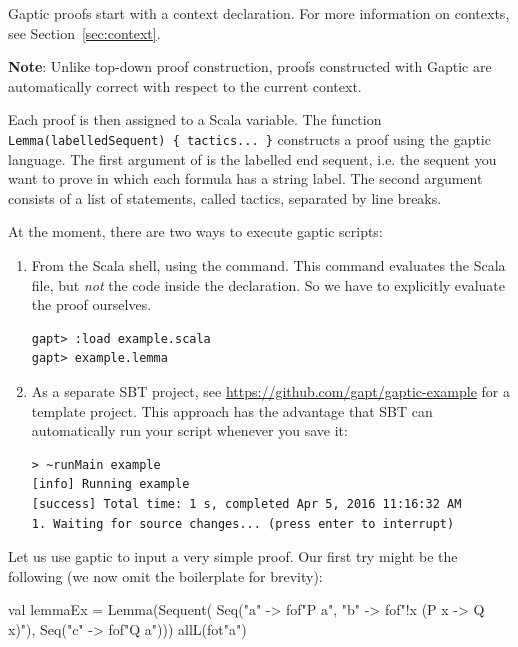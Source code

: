 \documentclass[a4paper,11pt]{book}
\newcommand{\cli}[1]{{\ttfamily {#1}}}
\begin{document}
Gaptic proofs start with a context declaration. For more information on
contexts, see Section~\ref{sec:context}.

\textbf{Note}: Unlike top-down proof construction, proofs constructed with Gaptic
are automatically correct with respect to the current context.

Each proof is then assigned to a Scala variable.  The function
\verb,Lemma(labelledSequent) { tactics... }, constructs a proof using the
gaptic language.  The first argument of \cli{Lemma} is the labelled end
sequent, i.e. the sequent you want to prove in which each formula has a string
label.  The second argument consists of a list of statements, called tactics,
separated by line breaks.

At the moment, there are two ways to execute gaptic scripts:
\begin{enumerate}

  \item From the Scala shell, using the \cli{:load} command.  This command
        evaluates the Scala file, but \emph{not} the code inside the \cli{object}
        declaration.  So we have to explicitly evaluate the proof ourselves.
        \begin{lstlisting}
gapt> :load example.scala
gapt> example.lemma
\end{lstlisting}

  \item As a separate SBT project, see
        \url{https://github.com/gapt/gaptic-example} for a template project.  This
        approach has the advantage that SBT can automatically run your script whenever
        you save it:
        \begin{lstlisting}
> ~runMain example
[info] Running example
[success] Total time: 1 s, completed Apr 5, 2016 11:16:32 AM
1. Waiting for source changes... (press enter to interrupt)
\end{lstlisting}

\end{enumerate}

Let us use gaptic to input a very simple proof.  Our first try might be the
following (we now omit the boilerplate for brevity):
\begin{tacticslisting}
  val lemmaEx =
  Lemma(Sequent(
  Seq("a" -> fof"P a", "b" -> fof"!x (P x -> Q x)"),
  Seq("c" -> fof"Q a"))) {
      allL(fot"a")
    }
\end{tacticslisting}
\end{document}
